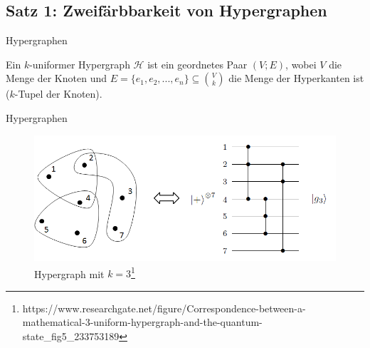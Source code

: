 
\begin{frame}[plain]
	\section{Satz 1: Zweifärbbarkeit von Hypergraphen}
\end{frame}

\begin{frame}{Hypergraphen}
	\begin{definition}
		\vspace{0.25cm}
		Ein $k$-uniformer Hypergraph $\mathcal{H}$ ist ein geordnetes Paar $(V; E)$, wobei $V$ die Menge der Knoten und $E = \{e_1, e_2, ..., e_n\} \subseteq \binom{V}{k}$ die Menge der Hyperkanten ist ($k$-Tupel der Knoten). \cite{Matousek2008}
	\end{definition}
	
\end{frame}

\begin{frame}{Hypergraphen}
	\begin{figure}
		\includegraphics[width=\linewidth]{content/fig/1-hypergraph3}
		\caption{Hypergraph mit $k=3$\footnote{https://www.researchgate.net/figure/Correspondence-between-a-mathematical-3-uniform-hypergraph-and-the-quantum-state\_fig5\_233753189}}
	\end{figure}
\end{frame}

